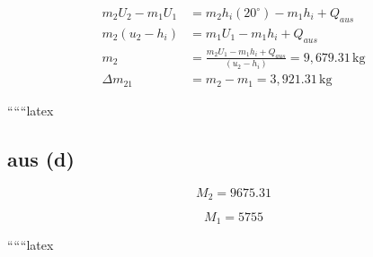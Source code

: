 \begin{align*}
m_2 U_2 - m_1 U_1 &= m_2 h_i (20^\circ) - m_1 h_i + Q_{aus} \\
m_2 (u_2 - h_i) &= m_1 U_1 - m_1 h_i + Q_{aus} \\
m_2 &= \frac{m_2 U_1 - m_1 h_i + Q_{aus}}{(u_2 - h_i)} = 9,679.31 \, \text{kg} \\
\Delta m_{21} &= m_2 - m_1 = 3,921.31 \, \text{kg}
\end{align*}

``````latex

\subsection*{aus (d)}

\begin{equation*}
    M_2 = 9675.31
\end{equation*}

\begin{equation*}
    M_1 = 5755
\end{equation*}

``````latex